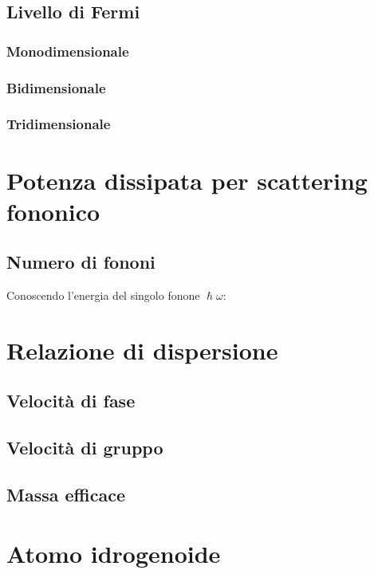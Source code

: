 \documentclass[10pt,a4paper]{report}
\begin{document}
	\section{Livello di Fermi}

		\subsection{Monodimensionale}

		\subsection{Bidimensionale}

		\subsection{Tridimensionale}

\chapter{Potenza dissipata per scattering fononico}

 	\section{Numero di fononi}

 	Conoscendo l'energia del singolo fonone $\hslash \omega$:



\chapter{Relazione di dispersione}

	\section{Velocità di fase}

	\section{Velocità di gruppo}

	\section{Massa efficace}


\chapter{Atomo idrogenoide}
	
\end{document}
